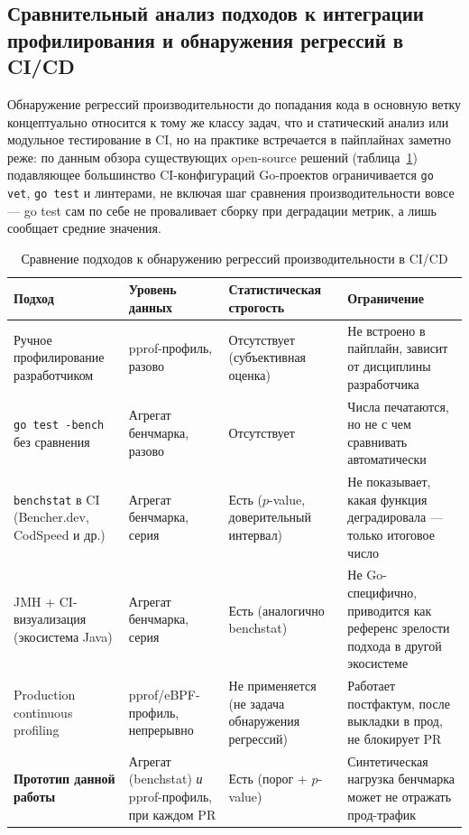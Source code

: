 \documentclass[12pt,a4paper]{article}
\numberwithin{equation}{section}
\begin{document}
\subsection{Сравнительный анализ подходов к интеграции профилирования и обнаружения регрессий в CI/CD}
\label{sec:1.2}

Обнаружение регрессий производительности до попадания кода в основную ветку
концептуально относится к тому же классу задач, что и статический анализ или
модульное тестирование в CI, но на практике встречается в пайплайнах заметно
реже: по данным обзора существующих open-source решений (таблица~\ref{tab:1.1})
подавляющее большинство CI-конфигураций Go-проектов ограничивается
\texttt{go vet}, \texttt{go test} и линтерами, не включая шаг сравнения
производительности вовсе — go test сам по себе не проваливает сборку при
деградации метрик, а лишь сообщает средние значения.

\begin{table}[htbp]
\caption{Сравнение подходов к обнаружению регрессий производительности в CI/CD}
\label{tab:1.1}
\centering
\begin{tabular}{p{3.4cm}p{3.2cm}p{3.2cm}p{4.2cm}}
\toprule
Подход & Уровень данных & Статистическая строгость & Ограничение \\
\midrule
Ручное профилирование разработчиком & pprof-профиль, разово & Отсутствует (субъективная оценка) & Не встроено в пайплайн, зависит от дисциплины разработчика \\
\addlinespace
\texttt{go test -bench} без сравнения & Агрегат бенчмарка, разово & Отсутствует & Числа печатаются, но не с чем сравнивать автоматически \\
\addlinespace
\texttt{benchstat} в CI (Bencher.dev, CodSpeed и др.) & Агрегат бенчмарка, серия & Есть ($p$-value, доверительный интервал) & Не показывает, какая функция деградировала — только итоговое число \\
\addlinespace
JMH + CI-визуализация (экосистема Java) & Агрегат бенчмарка, серия & Есть (аналогично benchstat) & Не Go-специфично, приводится как референс зрелости подхода в другой экосистеме \\
\addlinespace
Production continuous profiling & pprof/eBPF-профиль, непрерывно & Не применяется (не задача обнаружения регрессий) & Работает постфактум, после выкладки в прод, не блокирует PR \\
\addlinespace
\textbf{Прототип данной работы} & Агрегат (benchstat) \emph{и} pprof-профиль, при каждом PR & Есть (порог + $p$-value) & Синтетическая нагрузка бенчмарка может не отражать прод-трафик \\
\bottomrule
\end{tabular}
\end{table}
\end{document}
